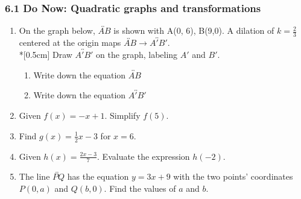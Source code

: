 \documentclass[12pt, twoside]{article}
\begin{document}
\subsubsection*{6.1 Do Now: Quadratic graphs and transformations}
  \begin{enumerate}


\item On the graph below, $\overleftrightarrow{AB}$ is shown with A(0, 6), B(9,0). A dilation of $k=\frac{2}{3}$ centered at the origin maps $\overleftrightarrow{AB} \rightarrow \overleftrightarrow{A'B'}$.\\*[0.5cm]
  Draw $\overleftrightarrow{A'B'}$ on the graph, labeling $A'$ and $B'$.
    \begin{center}
    \end{center}
      \vspace{1cm}
    \begin{enumerate}
      \item Write down the equation $\overleftrightarrow{AB}$ \vspace{2cm}
      \item Write down the equation $\overleftrightarrow{A'B'}$
    \end{enumerate}
    
\newpage

\item Given $f(x)=-x+1$. Simplify $f(5)$. \vspace{2cm}
\item Find $g(x)=\frac{1}{2} x-3$ for $x=6$. \vspace{2.5cm}
\item Given $\displaystyle h(x)=\frac{2x-3}{7}$. Evaluate the expression $h(-2)$. \vspace{3cm}

\item The line $\overleftrightarrow{PQ}$ has the equation $y=3x+9$ with the two points' coordinates $P(0,a)$ and $Q(b,0)$. Find the values of $a$ and $b$. \vspace{5cm}


\end{enumerate}
\end{document}
